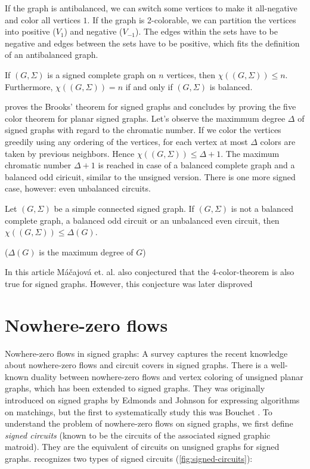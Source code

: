If the graph is antibalanced, we can switch some vertices to make it all-negative and color all vertices $1$.
If the graph is 2-colorable, we can partition the vertices into positive ($V_1$) and negative ($V_{-1}$).
The edges within the sets have to be negative and edges between the sets have to be positive, which fits the definition of an antibalanced graph.

\begin{proposition}[Máčajová et. al.]
    If $(G, \Sigma)$ is a signed complete graph on $n$ vertices, then $\chi ((G, \Sigma)) \leq n$. 
    Furthermore, $\chi ((G, \Sigma)) = n$ if and only if $(G, \Sigma)$ is balanced.
\end{proposition}

\cite{chromatic-number} proves the Brooks' theorem\cite{brooks} for signed graphs and concludes by proving the five color theorem for planar signed graphs.
Let's observe the maximmum degree $\Delta$ of signed graphs with regard to the chromatic number.
If we color the vertices greedily using any ordering of the vertices, for each vertex at most
$\Delta$ colors are taken by previous neighbors. Hence $\chi ((G, \Sigma)) \leq \Delta + 1$. 
The maximum chromatic number $\Delta + 1$ is reached in case of a balanced complete graph and
a balanced odd ciricuit, similar to the unsigned version. There is one more signed case, however: even unbalanced circuits.

\begin{theorem}[Máčajová et. al.]
    Let $(G, \Sigma)$ be a simple connected signed graph. If $(G, \Sigma)$ is not a balanced complete graph,
    a balanced odd circuit or an unbalanced even circuit, then $\chi ((G, \Sigma)) \leq \Delta (G)$.
\end{theorem}

($\Delta (G)$ is the maximum degree of $G$)

In this article Máčajová et. al. also conjectured that the 4-color-theorem is also true for signed graphs. However, this conjecture
was later disproved\cite{signed-4-color-conjecture}

\section{Nowhere-zero flows}

Nowhere-zero flows in signed graphs: A survey\cite{nowhere-zero-flows-survey} captures the recent knowledge about nowhere-zero flows and circuit covers in signed graphs.
There is a well-known duality between nowhere-zero flows and vertex coloring of unsigned planar graphs, which has been extended to signed graphs. 
They was originally introduced on signed graphs by Edmonds and Johnson\cite{edmonds-johnson} for expressing algorithms on matchings, but the first to systematically study this was Bouchet \cite{bouchet-flows}.
To understand
the problem of nowhere-zero flows on signed graphs, we first define \textit{signed circuits} (known to be the circuits of the associated signed graphic matroid). 
They are the equivalent of circuits on unsigned graphs for signed graphs. \cite{nowhere-zero-flows-survey} recognizes two types of signed circuits (\cref{fig:signed-circuits}):

